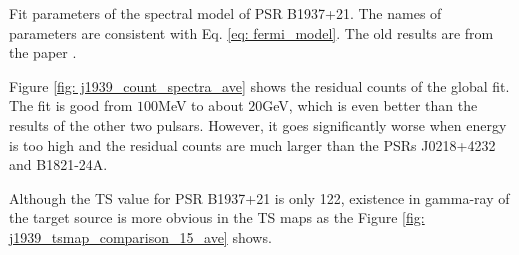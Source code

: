 \documentclass[12pt]{report}
\newcommand{\mycaption}[1]{\protect \caption{#1}}
\begin{document}
            \begin{table}[!ht]
              \centering
                \mycaption{Fit parameters of the spectral model of PSR B1937+21. 
                  The names of parameters are consistent with Eq.
                  \ref{eq: fermi_model}. The old results are from the paper \cite{0004-637X-787-2-167}.}
                \label{table: j1939_fit_result_ave}        
            \end{table} 

            Figure \ref{fig: j1939_count_spectra_ave} shows the residual counts of the global fit.
            The fit is good from $100$MeV to about $20$GeV, which is even better than the results 
            of the other two pulsars. However, it goes significantly worse when energy is too 
            high and the residual counts are much larger than the PSRs J0218+4232 and B1821-24A.

            Although the TS value for PSR B1937+21 is only 122, existence in gamma-ray of the 
            target source is more obvious in the TS maps as the Figure 
            \ref{fig: j1939_tsmap_comparison_15_ave} shows. 
\end{document}

